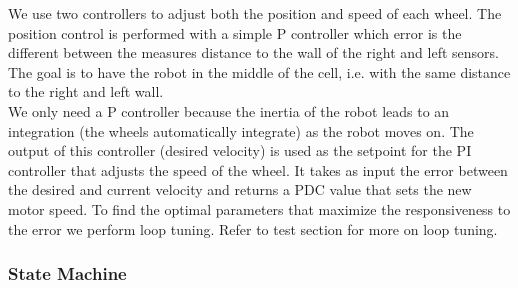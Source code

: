 We use two controllers to adjust both the position and speed of each wheel. 
\vskip 0.1in
\noindent
The position control is performed with a simple P controller which error is the different between the measures distance to the wall of the right and left sensors. The goal is to have the robot in the middle of the cell, i.e. with the same distance to the right and left wall.\\
We only need a P controller because the inertia of the robot leads to an integration (the wheels automatically integrate) as the robot moves on.
\vskip 0.1in
\noindent
The output of this controller (desired velocity) is used as the setpoint for the PI controller that adjusts the speed of the wheel. It takes as input the error between the desired and current velocity and returns a PDC value that sets the new motor speed.
\vskip 0.1in
\noindent
To find the optimal parameters that maximize the responsiveness to the error we perform loop tuning. Refer to test section for more on loop tuning. 

\subsubsection{State Machine}

